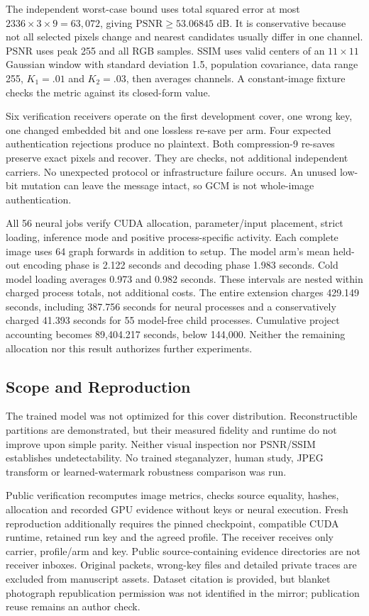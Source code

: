 The independent worst-case bound uses total squared error at most $2336\times3\times9=63,072$, giving $\mathrm{PSNR}\geq53.06845$ dB. It is conservative because not all selected pixels change and nearest candidates usually differ in one channel. PSNR uses peak 255 and all RGB samples. SSIM uses valid centers of an $11\times11$ Gaussian window with standard deviation 1.5, population covariance, data range 255, $K_1=.01$ and $K_2=.03$, then averages channels. A constant-image fixture checks the metric against its closed-form value.

Six verification receivers operate on the first development cover, one wrong key, one changed embedded bit and one lossless re-save per arm. Four expected authentication rejections produce no plaintext. Both compression-9 re-saves preserve exact pixels and recover. They are checks, not additional independent carriers. No unexpected protocol or infrastructure failure occurs. An unused low-bit mutation can leave the message intact, so GCM is not whole-image authentication.

All 56 neural jobs verify CUDA allocation, parameter/input placement, strict loading, inference mode and positive process-specific activity. Each complete image uses 64 graph forwards in addition to setup. The model arm's mean held-out encoding phase is 2.122 seconds and decoding phase 1.983 seconds. Cold model loading averages 0.973 and 0.982 seconds. These intervals are nested within charged process totals, not additional costs. The entire extension charges 429.149 seconds, including 387.756 seconds for neural processes and a conservatively charged 41.393 seconds for 55 model-free child processes. Cumulative project accounting becomes 89,404.217 seconds, below 144,000. Neither the remaining allocation nor this result authorizes further experiments.

\subsection{Scope and Reproduction}
The trained model was not optimized for this cover distribution. Reconstructible partitions are demonstrated, but their measured fidelity and runtime do not improve upon simple parity. Neither visual inspection nor PSNR/SSIM establishes undetectability. No trained steganalyzer, human study, JPEG transform or learned-watermark robustness comparison was run.

Public verification recomputes image metrics, checks source equality, hashes, allocation and recorded GPU evidence without keys or neural execution. Fresh reproduction additionally requires the pinned checkpoint, compatible CUDA runtime, retained run key and the agreed profile. The receiver receives only carrier, profile/arm and key. Public source-containing evidence directories are not receiver inboxes. Original packets, wrong-key files and detailed private traces are excluded from manuscript assets. Dataset citation is provided, but blanket photograph republication permission was not identified in the mirror; publication reuse remains an author check.
